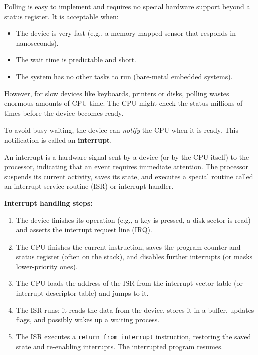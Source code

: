 \documentclass[11pt]{article}
\newcommand{\cle}[1]{{\popxbold\color{popdark}#1}}
\newcounter{popsec}
\newcounter{popsub}
\newcommand{\courssub}[1]{%
  \stepcounter{popsub}%
  \par\vspace{9pt}\noindent{\popxbold\fontsize{11.5}{13}\selectfont\color{popink}{\color{poporange}\thepopsec.\thepopsub}\hspace{6pt}#1}\par\nopagebreak\vspace{4pt}
}
\begin{document}
Polling is easy to implement and requires no special hardware support beyond a status register. It is acceptable when:
\begin{itemize}
\item The device is very fast (e.g., a memory-mapped sensor that responds in nanoseconds).
\item The wait time is predictable and short.
\item The system has no other tasks to run (bare-metal embedded systems).
\end{itemize}

However, for slow devices like keyboards, printers or disks, polling wastes enormous amounts of CPU time. The CPU might check the status millions of times before the device becomes ready.

\courssub{Interrupt-Driven I/O}

To avoid busy-waiting, the device can \emph{notify} the CPU when it is ready. This notification is called an \textbf{interrupt}.

\begin{definition}[Interrupt]
An \cle{interrupt} is a hardware signal sent by a device (or by the CPU itself) to the processor, indicating that an event requires immediate attention. The processor suspends its current activity, saves its state, and executes a special routine called an \cle{interrupt service routine (ISR)} or \cle{interrupt handler}.
\end{definition}

\textbf{Interrupt handling steps:}\par
\begin{enumerate}
\item The device finishes its operation (e.g., a key is pressed, a disk sector is read) and asserts the interrupt request line (IRQ).
\item The CPU finishes the current instruction, saves the program counter and status register (often on the stack), and disables further interrupts (or masks lower-priority ones).
\item The CPU loads the address of the ISR from the \cle{interrupt vector table} (or interrupt descriptor table) and jumps to it.
\item The ISR runs: it reads the data from the device, stores it in a buffer, updates flags, and possibly wakes up a waiting process.
\item The ISR executes a \texttt{return from interrupt} instruction, restoring the saved state and re-enabling interrupts. The interrupted program resumes.
\end{enumerate}
\end{document}

